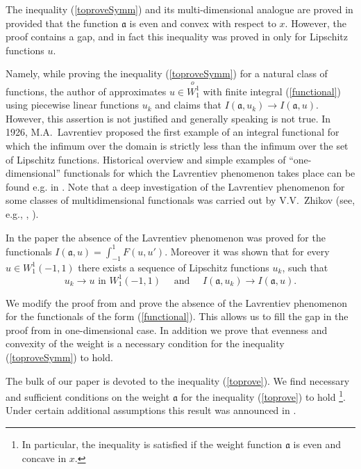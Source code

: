 \documentclass[12pt]{article}
\newcommand{\Wf}{\stackrel{o\ }{W_1^1}}
\newcommand{\W}{W_1^1}
\begin{document}
The inequality (\ref{toproveSymm}) and its multi-dimensional analogue
are proved in \cite{Br} provided that the function $\mathfrak a$ is even and convex 
with respect to $x$. However, the proof contains a gap,
and in fact this inequality was proved in \cite{Br} only for Lipschitz functions $u$.

Namely, while proving the inequality (\ref{toproveSymm}) for a natural class of functions,
the author of \cite{Br} approximates $u \in \Wf$ with finite integral (\ref{functional})
using piecewise linear functions $u_k$ and claims that $I(\mathfrak a, u_k) \to I(\mathfrak a, u)$.
However, this assertion is not justified and generally speaking is not true.
In 1926, M.A.~Lavrentiev proposed the first example of an integral functional
for which the infimum over the domain is strictly less than the infimum over the set of 
Lipschitz functions.
Historical overview and simple examples of ``one-dimensional'' 
functionals for which the Lavrentiev phenomenon takes place can be found e.g. in \cite{BGH}.
Note that a deep investigation of the Lavrentiev phenomenon for some classes of multidimensional 
functionals was carried out by V.V.~Zhikov (see, e.g., \cite{Zh1}, \cite{Zh2}).

In the paper \cite{ASC} the absence of the Lavrentiev phenomenon was proved for the functionals
$I(\mathfrak a, u) = \int_{-1}^1 F(u, u')$. Moreover it was shown that for every $u \in \W(-1, 1)$ 
there exists a sequence of Lipschitz functions $u_k$, such that
\begin{equation}
\label{convergence}
u_k \to u \text{ in } \W (-1, 1) \quad \text{ and } \quad I (\mathfrak a, u_k) \to I (\mathfrak a, u).
\end{equation}

We modify the proof from \cite{ASC} and prove the absence of the Lavrentiev phenomenon
for the functionals of the form (\ref{functional}).
This allows us to fill the gap in the proof from \cite{Br} in one-dimensional case.
In addition we prove that evenness and convexity of the weight is a necessary condition
for the inequality (\ref{toproveSymm}) to hold.

The bulk of our paper is devoted to the inequality (\ref{toprove}).
We find necessary and sufficient conditions on the weight $\mathfrak a$ for the inequality 
(\ref{toprove}) to hold%
\footnote{In particular, the inequality is satisfied if the weight function $\mathfrak a$ is even 
and concave in $x$.}.
Under certain additional assumptions this result was announced in \cite{DAN}.
\end{document}
